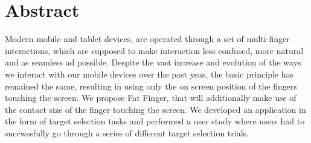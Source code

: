 \documentclass[10pt,twoside]{report}
\begin{document}
\thispagestyle{empty}

\pagestyle{plain}

\cleardoublepage

\chapter*{Abstract}

Modern mobile and tablet devices, are operated through a set of multi-finger interactions, which are supposed to make interaction less confused, more natural and as seamless ad possible.
Despite the vast increase and evolution of the ways we interact with our mobile devices over the past yeas, the basic principle has remained the same, resulting in using only the on screen position of the fingers touching the screen.
We propose Fat Finger, that will additionally make use of the contact size of the finger touching the screen.
We developed an application in the form of target selection tasks and performed a user study where users had to succwssfully go through a series of different target selection trials.
\end{document}
